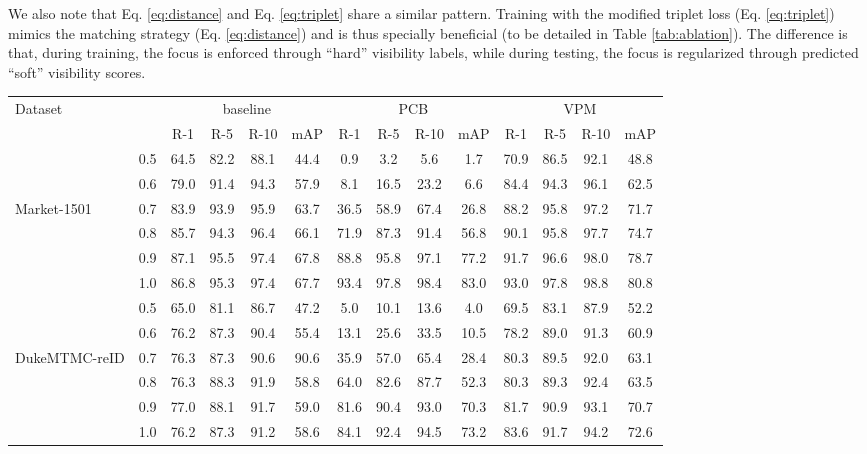 \documentclass[10pt,twocolumn,letterpaper]{article}
\begin{document}
We also note that Eq. \ref{eq:distance} and Eq. \ref{eq:triplet} share a similar pattern. Training with the modified triplet loss (Eq. \ref{eq:triplet}) mimics the matching strategy (Eq. \ref{eq:distance}) and is thus specially beneficial (to be detailed in Table \ref{tab:ablation}). The difference is that, during training, the focus is enforced through ``hard'' visibility labels, while during testing, the focus is regularized through predicted ``soft'' visibility scores. 

\setlength{\tabcolsep}{6.5pt}
\begin{table*}[t]
\begin{center}
\begin{tabular}{l|c|ccc c|ccc c|ccc c}
\hline
\multicolumn{1}{l|}{\multirow{2}{*}{Dataset }}&\multicolumn{1}{c|}{\multirow{2}{*}{}}&\multicolumn{4}{c|}{baseline} & \multicolumn{4}{c|}{PCB} & \multicolumn{4}{c}{VPM}\\ 
\cline{3-14}
\multicolumn{1}{c|}{}&\multicolumn{1}{c|}{}&\multicolumn{1}{c}{R-1}&R-5&R-10&{mAP}&{R-1}&R-5&R-10&{mAP}&{R-1}&R-5&R-10&{mAP}\\
\hline


            & 0.5 &64.5&82.2&88.1&44.4  &0.9 &3.2 &5.6 &1.7  &70.9&86.5&92.1&48.8\\
            & 0.6 &79.0&91.4&94.3&57.9  &8.1 &16.5 &23.2 &6.6  &84.4&94.3&96.1&62.5\\
Market-1501 & 0.7 &83.9&93.9&95.9&63.7  &36.5 &58.9 &67.4 &26.8  &88.2&95.8&97.2&71.7\\
            & 0.8 &85.7&94.3&96.4&66.1  &71.9 &87.3 &91.4 &56.8  &90.1&95.8&97.7&74.7\\
            & 0.9 &87.1&95.5&97.4&67.8  &88.8 &95.8 &97.1 &77.2  &91.7&96.6&98.0&78.7\\
            & 1.0 &86.8&95.3&97.4&67.7  &93.4 &97.8 &98.4 &83.0    &93.0&97.8&98.8&80.8\\
\hline
              &0.5  &65.0&81.1&86.7&47.2  &5.0 &10.1 &13.6 & 4.0     &69.5&83.1&87.9&52.2\\
              &0.6  &76.2&87.3&90.4&55.4  &13.1 &25.6 &33.5 &10.5    &78.2&89.0&91.3&60.9\\
DukeMTMC-reID &0.7  &76.3&87.3&90.6&90.6  &35.9 &57.0 &65.4 &28.4    &80.3&89.5&92.0&63.1\\
              &0.8  &76.3&88.3&91.9&58.8  &64.0 &82.6 &87.7 &52.3    &80.3&89.3&92.4&63.5\\
              &0.9  &77.0&88.1&91.7&59.0 &81.6 &90.4 &93.0 &70.3    &81.7&90.9&93.1&70.7\\
              &1.0  &76.2&87.3&91.2&58.6  &84.1 &92.4 &94.5 &73.2    &83.6&91.7&94.2&72.6\\
  

\end{tabular}
\end{center}
\end{table*}
\end{document}
